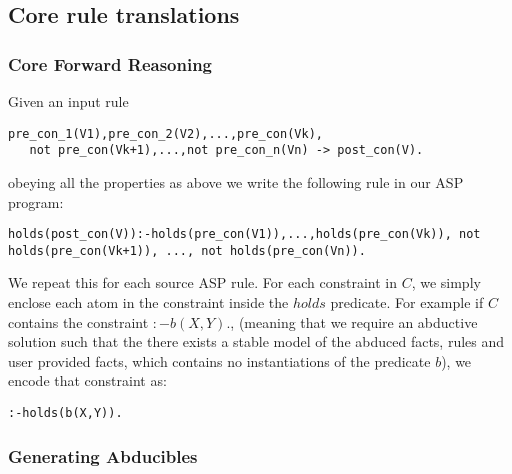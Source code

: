 \documentclass[sigconf]{acmart}
\begin{document}
\subsection{Core rule translations}

\subsubsection{Core Forward Reasoning}
Given an input rule 
\begin{lstlisting}[frame=none]
pre_con_1(V1),pre_con_2(V2),...,pre_con(Vk),
   not pre_con(Vk+1),...,not pre_con_n(Vn) -> post_con(V).
\end{lstlisting}
obeying all the properties as above we write the following rule in our ASP program: 
\begin{lstlisting}[frame=none]
holds(post_con(V)):-holds(pre_con(V1)),...,holds(pre_con(Vk)), not holds(pre_con(Vk+1)), ..., not holds(pre_con(Vn)). 
\end{lstlisting}

We repeat this for each source ASP rule. For each constraint in $C$, we simply
enclose each atom in the constraint inside the $holds$ predicate. For example
if $C$ contains the constraint $:-b(X,Y).$, (meaning that we require an
abductive solution such that the there exists a stable model of the abduced
facts, rules and user provided facts, which contains no instantiations of the
predicate $b$), we encode that constraint as: 
\begin{lstlisting}[frame=none]
:-holds(b(X,Y)).
\end{lstlisting}

\subsubsection{Generating Abducibles}
\end{document}
